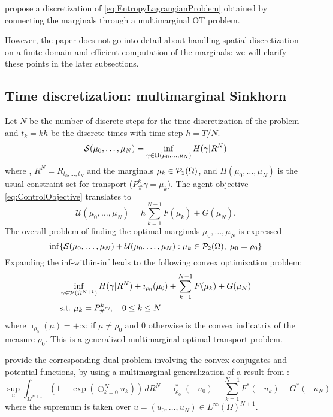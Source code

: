 \documentclass[../report.tex]{subfiles}
\begin{document}
\textcite{benamou2018entropy} propose a discretization of \eqref{eq:EntropyLagrangianProblem} obtained by connecting the marginals through a multimarginal OT problem.

However, the paper does not go into detail about handling spatial discretization on a finite domain and efficient computation of the marginals: we will clarify these points in the later subsections.


\subsection{Time discretization: multimarginal Sinkhorn}\label{sec:MMOT}

Let $N$ be the number of discrete steps for the time discretization of the problem and $t_k = kh$ be the discrete times with time step $h=T/N$.
\begin{equation}
	\mathcal{S}(\mu_0,\ldots,\mu_N) = 
	\inf_{\gamma \in \Pi(\mu_0, \ldots, \mu_N)} H(\gamma | R^N)
\end{equation}
where , $R^N = R_{t_0,\ldots,t_N}$ and the marginals $\mu_k \in \mathcal{P}_2(\Omega)$, and $\Pi(\mu_0, \ldots, \mu_N)$ is the usual constraint set for transport ($P^k_{\#}\gamma = \mu_k$). The agent objective \cref{eq:ControlObjective} translates to
\begin{equation}
	\mathcal{U}(\mu_0,\ldots,\mu_N) = h\sum_{k=1}^{N-1} F(\mu_k) + G(\mu_N).
\end{equation}
The overall problem of finding the optimal marginals $\mu_0,\ldots,\mu_N$ is expressed
\begin{equation}
	\inf \{
	\mathcal{S}(\mu_0, \ldots, \mu_N) + \mathcal{U}(\mu_0, \ldots, \mu_N) 
	: \mu_k \in \mathcal{P}_2(\Omega),\; \mu_0 = \rho_0
	\}
\end{equation}
Expanding the inf-within-inf leads to the following convex optimization problem:
\begin{equation}
\begin{aligned}
&\inf_{\gamma \in \mathcal{P}(\Omega^{N+1})}
H(\gamma | R^N) + \imath_{\rho_0}(\mu_0) + \sum_{k=1}^{N-1} F(\mu_k) + G(\mu_N) \\
&\mathrm{s.t.}\ \mu_k = P^k_\#\gamma,\quad 0\leq k\leq N
\end{aligned}
\end{equation}
where $\imath_{\rho_0}(\mu) = +\infty$ if $\mu\neq \rho_0$ and $0$ otherwise is the convex indicatrix of the measure $\rho_0$. This is a generalized multimarginal optimal transport problem.

\textcite{benamou2018entropy} provide the corresponding dual problem involving the convex conjugates and potential functions, by using a multimarginal generalization of a result from \textcite{chizat2016scaling}:
\begin{equation}\label{eq:TimeDiscreteDual}
\sup_u
\int_{\Omega^{N+1}} \left(1-\exp\left(\oplus_{k=0}^N u_k\right)\right) \,dR^N
-\imath_{\rho_0}^*(-u_0) - \sum_{k=1}^{N-1} F^*(-u_k) - G^*(-u_N)
\end{equation}
where the supremum is taken over $u = (u_0,\ldots,u_N) \in L^\infty(\Omega)^{N+1}$.
\end{document}
